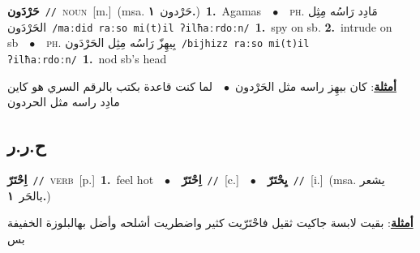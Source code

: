 \documentclass[10pt,a4paper,twoside]{article} %
\begin{document}
\begin{multicols}{2}
{\setlength\topsep{0pt}\textbf{\foreignlanguage{arabic}{حَرْدَون}}\ {\color{gray}\texttt{//}\color{black}}\ \textsc{noun}\ [m.]\ \color{gray}(msa. \foreignlanguage{arabic}{حَرْدون}~\foreignlanguage{arabic}{\textbf{١.}})\color{black}\ \textbf{1.}~Agamas\ \ $\bullet$\ \ \textsc{ph.} \color{gray} \foreignlanguage{arabic}{مَادِد رَاسُه مِثِل الحَرْدَون}\color{black}\ {\color{gray}\texttt{/{\sffamily maːdid raːso mi(t)il ʔilħaːrdoːn}/}\color{black}}\ \textbf{1.}~spy on sb.  \textbf{2.}~intrude on sb\ \ $\bullet$\ \ \textsc{ph.} \color{gray} \foreignlanguage{arabic}{بِيهِزّ رَاسُه مِثِل الحَرْدَون}\color{black}\ {\color{gray}\texttt{/{\sffamily bijhizz raːso mi(t)il ʔilħaːrdoːn}/}\color{black}}\ \textbf{1.}~nod sb's head\  \begin{flushright}\color{gray}\foreignlanguage{arabic}{\textbf{\underline{\foreignlanguage{arabic}{أمثلة}}}: كان بيهِز راسه مثل الحَرْدون\ $\bullet$\ \  لما كنت قاعدة بكتب بالرقم السري هو كاين مادِد راسه مثل الحردون}\end{flushright}\color{black}} \vspace{2mm}

\vspace{-3mm}
\subsection*{\color{blue}\foreignlanguage{arabic}{ح.ر.ر}\color{blue}{}} 

{\setlength\topsep{0pt}\textbf{\foreignlanguage{arabic}{اِحْتَرّ}}\ {\color{gray}\texttt{//}\color{black}}\ \textsc{verb}\ [p.]\ \textbf{1.}~feel hot\ \ $\bullet$\ \ \setlength\topsep{0pt}\textbf{\foreignlanguage{arabic}{اِحْتَرّ}}\ {\color{gray}\texttt{//}\color{black}}\ [c.]\ \ $\bullet$\ \ \setlength\topsep{0pt}\textbf{\foreignlanguage{arabic}{يِحْتَرّ}}\ {\color{gray}\texttt{//}\color{black}}\ [i.]\ \color{gray}(msa. \foreignlanguage{arabic}{يشعر بالحَر}~\foreignlanguage{arabic}{\textbf{١.}})\color{black}\  \begin{flushright}\color{gray}\foreignlanguage{arabic}{\textbf{\underline{\foreignlanguage{arabic}{أمثلة}}}: بقيت لابسة جاكيت ثقيل فاحْتَرّيت كثير واضطريت أشلحه وأضل بهالبلوزة الخفيفة بس}\end{flushright}\color{black}} \vspace{2mm}


\end{multicols}
\end{document}
